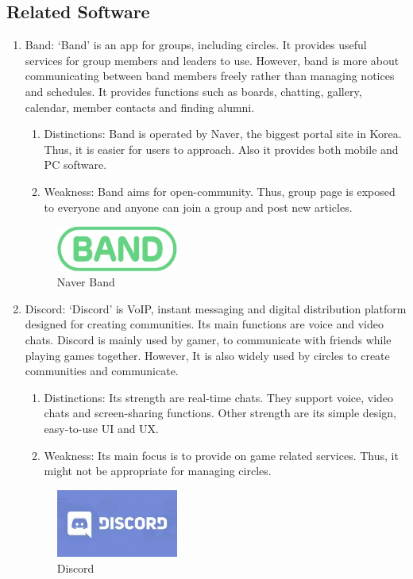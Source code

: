 \documentclass[conference]{IEEEtran}
\begin{document}
\subsection{Related Software}
\begin{enumerate}
    \item Band: `Band' is an app for groups, including circles. It provides useful services for group members and leaders to use. However, band is more about communicating between band members freely rather than managing notices and schedules. It provides functions such as boards, chatting, gallery, calendar, member contacts and finding alumni.
    \begin{enumerate}
        \item Distinctions: Band is operated by Naver, the biggest portal site in Korea. Thus, it is easier for users to approach. Also it provides both mobile and PC software.
        \item Weakness: Band aims for open-community. Thus, group page is exposed to everyone and anyone can join a group and post new articles.
    \end{enumerate}
    \begin{figure}[h]
        \centering
        \includegraphics[width=4cm]{images/band.jpeg}
        \caption{Naver Band}
        \label{fig:my_label}
    \end{figure}
    \item Discord: `Discord' is VoIP, instant messaging and digital distribution platform designed for creating communities. Its main functions are voice and video chats. Discord is mainly used by gamer, to communicate with friends while playing games together. However, It is also widely used by circles to create communities and communicate. 
     \begin{enumerate}
        \item Distinctions: Its strength are real-time chats. They support voice, video chats and screen-sharing functions. Other strength are its simple design, easy-to-use UI and UX.
        \item Weakness: Its main focus is to provide on game related services. Thus, it might not be appropriate for managing circles.
    \end{enumerate}
     \begin{figure}[h]
        \centering
        \includegraphics[width=4cm]{images/discord.jpeg}
        \caption{Discord}
        \label{fig:my_label}
    \end{figure}
     

\end{enumerate}
\end{document}
